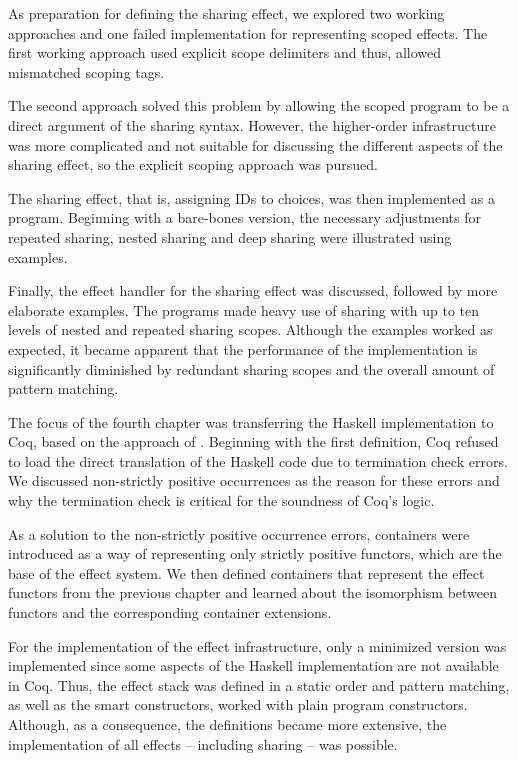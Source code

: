 \documentclass[a4paper, 11pt, fleqn, twoside, abstract=on]{scrreprt}
\begin{document}
As preparation for defining the sharing effect, we explored two working approaches and one failed implementation for representing scoped effects.
The first working approach used explicit scope delimiters and thus, allowed mismatched scoping tags.

The second approach solved this problem by allowing the scoped program to be a direct argument of the sharing syntax.
However, the higher-order infrastructure was more complicated and not suitable for discussing the different aspects of the sharing effect, so the explicit scoping approach was pursued.

The sharing effect, that is, assigning IDs to choices, was then implemented as a program.
Beginning with a bare-bones version, the necessary adjustments for repeated sharing, nested sharing and deep sharing were illustrated using examples.

Finally, the effect handler for the sharing effect was discussed, followed by more elaborate examples.
The programs made heavy use of sharing with up to ten levels of nested and repeated sharing scopes.
Although the examples worked as expected, it became apparent that the performance of the implementation is significantly diminished by redundant sharing scopes and the overall amount of pattern matching.

The focus of the fourth chapter was transferring the Haskell implementation to Coq, based on the approach of \citet{dylus2019oneMonad}.
Beginning with the first definition, Coq refused to load the direct translation of the Haskell code due to termination check errors.
We discussed non-strictly positive occurrences as the reason for these errors and why the termination check is critical for the soundness of Coq's logic.

As a solution to the non-strictly positive occurrence errors, containers were introduced as a way of representing only strictly positive functors, which are the base of the effect system.
We then defined containers that represent the effect functors from the previous chapter and learned about the isomorphism between functors and the corresponding container extensions.

For the implementation of the effect infrastructure, only a minimized version was implemented since some aspects of the Haskell implementation are not available in Coq.
Thus, the effect stack was defined in a static order and pattern matching, as well as the smart constructors, worked with plain program constructors.
Although, as a consequence, the definitions became more extensive, the implementation of all effects -- including sharing -- was possible.
\end{document}

